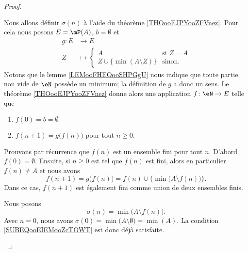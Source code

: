 \begin{proof}
\begin{subproof}
    Nous allons définir \( \sigma(n)\) à l'aide du théorème \ref{THOooEJPYooZFVnez}. Pour cela nous posons \( E=\mP(A)\), \( b=\emptyset\) et
    \begin{equation}
        \begin{aligned}
            g\colon E&\to E \\
            Z&\mapsto \begin{cases}
                A    &   \text{si } Z=A\\
                Z\cup\{ \min(A\setminus Z) \}    &    \text{sinon. }
            \end{cases}
        \end{aligned}
    \end{equation}
    Notons que le lemme \ref{LEMooFHEOooSHPGgU} nous indique que toute partie non vide de \( \eN\) possède un minimum; la définition de \( g\) a donc un sens. Le théorème \ref{THOooEJPYooZFVnez} donne alors une application \( f\colon \eN\to E\) telle que
    \begin{enumerate}
        \item
            \( f(0)=b=\emptyset\)
        \item
            \( f(n+1)=g\big( f(n) \big)\) pour tout \( n\geq 0\).
    \end{enumerate}
    Prouvons par récurrence que \( f(n)\) est un ensemble fini pour tout \( n\). D'abord \( f(0)=\emptyset\). Ensuite, si \( n\geq 0\) est tel que \( f(n)\) est fini, alors en particulier \( f(n)\neq A\) et nous avons
    \begin{equation}
        f(n+1)=g\big( f(n) \big)=f(n)\cup\{ \min\big( A\setminus f(n) \big)\}.
    \end{equation}
    Dans ce cas, \( f(n+1)\) est également fini comme union de deux ensembles finis.

    Nous posons
    \begin{equation}        \label{EQooGHQHooRnXDdo}
        \sigma(n)=\min\big( A\setminus f(n) \big).
    \end{equation}
    Avec \( n=0\), nous avons \( \sigma(0)=\min\big( A\setminus \emptyset \big)=\min(A)\). La condition \eqref{SUBEQooEIEMooZcTOWT} est donc déjà satisfaite.


\end{subproof}
\end{proof}
